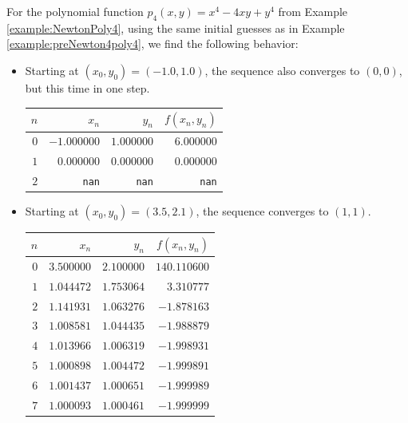 \begin{example}
For the polynomial function $p_4(x,y) = x^4-4xy+y^4$ from Example \ref{example:NewtonPoly4}, using the same initial guesses as in Example \ref{example:preNewton4poly4}, we find the following behavior:
\begin{itemize}
	\item Starting at $(x_0, y_0) = (-1.0,1.0)$, the sequence also converges to $(0,0)$, but this time in one step.
	\begin{center}
	\begin{tabular}{|r|r|r|r|} \hline 
	$n$ & $x_n$ & $y_n$ & $f(x_n,y_n)$ \\ \hline \hline 
	$0$ & $-1.000000$ & $1.000000$ & $6.000000$ \\ \hline 
	$1$ & $0.000000$ & $0.000000$ & $0.000000$ \\ \hline 
	$2$ & \texttt{nan} & \texttt{nan} & \texttt{nan} \\ \hline 
	\end{tabular}
	\end{center}
	\item Starting at $(x_0,y_0) = (3.5, 2.1)$, the sequence converges to $(1,1)$.
	\begin{center}
	\begin{tabular}{|r|r|r|r|} \hline 
	$n$ & $x_n$ & $y_n$ & $f(x_n,y_n)$ \\ \hline \hline 
	$0$ & $3.500000$ & $2.100000$ & $140.110600$ \\ \hline 
	$1$ & $1.044472$ & $1.753064$ & $3.310777$ \\ \hline 
	$2$ & $1.141931$ & $1.063276$ & $-1.878163$ \\ \hline 
	$3$ & $1.008581$ & $1.044435$ & $-1.988879$ \\ \hline 
	$4$ & $1.013966$ & $1.006319$ & $-1.998931$ \\ \hline 
	$5$ & $1.000898$ & $1.004472$ & $-1.999891$ \\ \hline 
	$6$ & $1.001437$ & $1.000651$ & $-1.999989$ \\ \hline 
	$7$ & $1.000093$ & $1.000461$ & $-1.999999$ \\ \hline 

\end{tabular}
\end{center}
\end{itemize}
\end{example}
